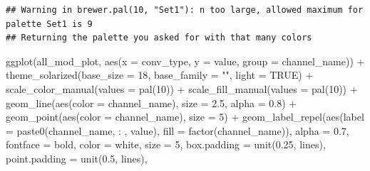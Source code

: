 \documentclass[
]{book}
\newenvironment{Shaded}{\begin{snugshade}}{\end{snugshade}}
\newcommand{\AttributeTok}[1]{\textcolor[rgb]{0.77,0.63,0.00}{#1}}
\newcommand{\ConstantTok}[1]{\textcolor[rgb]{0.00,0.00,0.00}{#1}}
\newcommand{\DecValTok}[1]{\textcolor[rgb]{0.00,0.00,0.81}{#1}}
\newcommand{\FloatTok}[1]{\textcolor[rgb]{0.00,0.00,0.81}{#1}}
\newcommand{\FunctionTok}[1]{\textcolor[rgb]{0.00,0.00,0.00}{#1}}
\newcommand{\NormalTok}[1]{#1}
\newcommand{\SpecialCharTok}[1]{\textcolor[rgb]{0.00,0.00,0.00}{#1}}
\newcommand{\StringTok}[1]{\textcolor[rgb]{0.31,0.60,0.02}{#1}}
\begin{document}
\begin{verbatim}
## Warning in brewer.pal(10, "Set1"): n too large, allowed maximum for palette Set1 is 9
## Returning the palette you asked for with that many colors
\end{verbatim}

\begin{Shaded}
\begin{Highlighting}[]
\FunctionTok{ggplot}\NormalTok{(all\_mod\_plot, }\FunctionTok{aes}\NormalTok{(}\AttributeTok{x =}\NormalTok{ conv\_type, }\AttributeTok{y =}\NormalTok{ value, }\AttributeTok{group =}\NormalTok{ channel\_name)) }\SpecialCharTok{+}
        \FunctionTok{theme\_solarized}\NormalTok{(}\AttributeTok{base\_size =} \DecValTok{18}\NormalTok{, }\AttributeTok{base\_family =} \StringTok{""}\NormalTok{, }\AttributeTok{light =} \ConstantTok{TRUE}\NormalTok{) }\SpecialCharTok{+}
        \FunctionTok{scale\_color\_manual}\NormalTok{(}\AttributeTok{values =} \FunctionTok{pal}\NormalTok{(}\DecValTok{10}\NormalTok{)) }\SpecialCharTok{+}
        \FunctionTok{scale\_fill\_manual}\NormalTok{(}\AttributeTok{values =} \FunctionTok{pal}\NormalTok{(}\DecValTok{10}\NormalTok{)) }\SpecialCharTok{+}
        \FunctionTok{geom\_line}\NormalTok{(}\FunctionTok{aes}\NormalTok{(}\AttributeTok{color =}\NormalTok{ channel\_name), }\AttributeTok{size =} \FloatTok{2.5}\NormalTok{, }\AttributeTok{alpha =} \FloatTok{0.8}\NormalTok{) }\SpecialCharTok{+}
        \FunctionTok{geom\_point}\NormalTok{(}\FunctionTok{aes}\NormalTok{(}\AttributeTok{color =}\NormalTok{ channel\_name), }\AttributeTok{size =} \DecValTok{5}\NormalTok{) }\SpecialCharTok{+}
        \FunctionTok{geom\_label\_repel}\NormalTok{(}\FunctionTok{aes}\NormalTok{(}\AttributeTok{label =} \FunctionTok{paste0}\NormalTok{(channel\_name, }\StringTok{\textquotesingle{}: \textquotesingle{}}\NormalTok{, value), }\AttributeTok{fill =} \FunctionTok{factor}\NormalTok{(channel\_name)),}
                         \AttributeTok{alpha =} \FloatTok{0.7}\NormalTok{,}
                         \AttributeTok{fontface =} \StringTok{\textquotesingle{}bold\textquotesingle{}}\NormalTok{, }\AttributeTok{color =} \StringTok{\textquotesingle{}white\textquotesingle{}}\NormalTok{, }\AttributeTok{size =} \DecValTok{5}\NormalTok{,}
                         \AttributeTok{box.padding =} \FunctionTok{unit}\NormalTok{(}\FloatTok{0.25}\NormalTok{, }\StringTok{\textquotesingle{}lines\textquotesingle{}}\NormalTok{), }\AttributeTok{point.padding =} \FunctionTok{unit}\NormalTok{(}\FloatTok{0.5}\NormalTok{, }\StringTok{\textquotesingle{}lines\textquotesingle{}}\NormalTok{),}

\end{Highlighting}
\end{Shaded}
\end{document}
